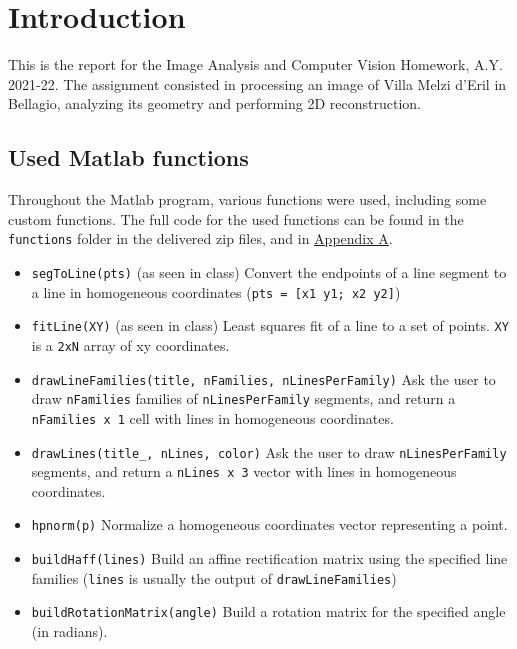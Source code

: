 \documentclass{Configuration_Files/PoliMi3i_thesis}
\begin{document}
\mainmatter %

\chapter{Introduction}

This is the report for the Image Analysis and Computer Vision Homework, A.Y. 2021-22.
The assignment consisted in processing an image of Villa Melzi d'Eril in Bellagio, analyzing its geometry and performing 2D reconstruction.
\section{Used Matlab functions}
Throughout the Matlab program, various functions were used, including some custom functions. The full code for the used functions can be found in the \verb|functions| folder in the delivered zip files, and in \hyperref[appendix:functions]{Appendix A}.

\begin{itemize}
\item \verb|segToLine(pts)| (as seen in class)\newline
Convert the endpoints of a line segment to a line in homogeneous coordinates (\verb|pts = [x1 y1; x2 y2]|)
\item \verb|fitLine(XY)| (as seen in class)\newline
Least squares fit of a line to a set of points. \verb|XY| is a \verb|2xN| array of xy coordinates.
\item \verb|drawLineFamilies(title, nFamilies, nLinesPerFamily)|\newline
Ask the user to draw \verb|nFamilies| families of \verb|nLinesPerFamily| segments, and return a \verb|nFamilies x 1| cell with lines in homogeneous coordinates.
\item \verb|drawLines(title_, nLines, color)|\newline
Ask the user to draw \verb|nLinesPerFamily| segments, and return a \verb|nLines x 3| vector with lines in homogeneous coordinates.
\item \verb|hpnorm(p)|\newline
Normalize a homogeneous coordinates vector representing a point.
\newpage
\item \verb|buildHaff(lines)|\newline
Build an affine rectification matrix using the specified line families (\verb|lines| is usually the output of \verb|drawLineFamilies|)
\item \verb|buildRotationMatrix(angle)|\newline
Build a rotation matrix for the specified angle (in radians).
\end{itemize}
\end{document}
